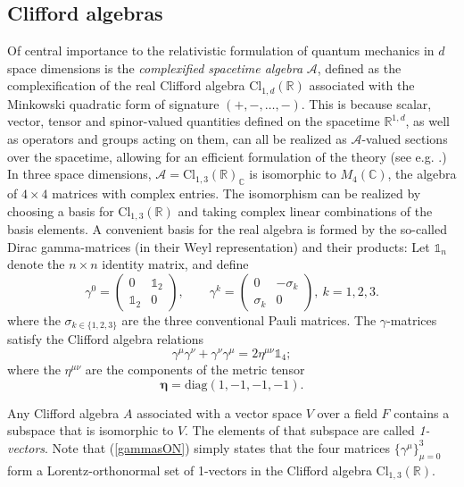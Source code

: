 \documentclass[12pt]{article}
\theoremstyle{definition}
\newcommand{\refeq}[1]{(\ref{#1})}
\numberwithin{equation}{section}
\newcommand{\beq}{\begin{equation}}
\newcommand{\eeq}{\end{equation}}
\newcommand{\Id}{\mathds{1}}
\newcommand{\cA}{\mathcal{A}}
\newcommand{\Cset}{{\mathbb C}}
\newcommand{\Rset}{{\mathbb R}}
\newcommand{\ga}{\gamma}
\newcommand{\si}{\sigma}
\newcommand{\diag}{\mbox{diag}}
\begin{document}
\subsection{Clifford algebras}\label{sec:clifford}
%
 Of central importance to the relativistic formulation of quantum mechanics in $d$ space dimensions is the 
{\em complexified spacetime algebra} $\cA$, defined as the complexification of the real Clifford algebra $\mbox{Cl}_{1,d}(\Rset)$ 
associated with the Minkowski quadratic form of signature $(+,-,\dots,-)$.  
 This is because scalar, vector, tensor and spinor-valued quantities defined on the spacetime $\Rset^{1,d}$, as well as operators 
and groups acting on them, can all be realized as $\cA$-valued sections over the spacetime, allowing for an efficient formulation 
of the theory  (see e.g. \cite{Hes2015}.) 
 In three space dimensions, $\cA = \mbox{Cl}_{1,3}(\Rset)_\Cset$ is isomorphic to $M_4(\Cset)$, the algebra of $4\times 4$ matrices 
with complex entries. 
 The isomorphism can be realized by choosing a basis for $\mbox{Cl}_{1,3}(\Rset)$ and taking complex linear  combinations of the basis elements. 
 A convenient basis for the real algebra is formed  by the so-called Dirac gamma-matrices (in their Weyl representation) and their products: 
 Let $\mathds{1}_n$ denote the $n\times n$ identity matrix, and define
\beq\label{def:gammas}
\ga^0 = \left( \begin{array}{cc}0 & \mathds{1}_2 \\ 
\mathds{1}_2 & 0 \end{array} \right),\qquad \ga^k = \left( \begin{array}{cc}0 & -\si_k \\
 \si_k & 0 \end{array} \right),\ k=1,2,3.
\eeq
where the $\si_{k\in\{1,2,3\}}$ are the three conventional Pauli matrices. 
 The $\ga$-matrices satisfy the Clifford algebra relations
\beq \label{gammasON}
\ga^\mu \ga^\nu + \ga^\nu \ga^\mu = 2 \eta^{\mu\nu}\Id_4;
\eeq
where the $\eta^{\mu\nu}$ are the components of the metric tensor 
\beq
\boldsymbol{\eta} = \diag(1,-1,-1,-1).
\eeq 

Any Clifford algebra $A$ associated with a vector space $V$ over a field $F$ contains a subspace that is isomorphic to $V$. 
 The elements of that subspace are called {\em 1-vectors}.  
Note that \refeq{gammasON} simply states that the four matrices $\{\ga^\mu\}_{\mu=0}^3$ form a Lorentz-orthonormal set of 
1-vectors in the Clifford algebra $\mbox{Cl}_{1,3}(\Rset)$.  
\end{document}
